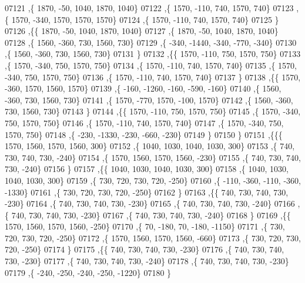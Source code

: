 \begin{DoxyCode}
07121     ,\{  1870,   -50,  1040,  1870,  1040\}
07122     ,\{  1570,  -110,   740,  1570,   740\}
07123     ,\{  1570,  -340,  1570,  1570,  1570\}
07124     ,\{  1570,  -110,   740,  1570,   740\}
07125     \}
07126    ,\{\{  1870,   -50,  1040,  1870,  1040\}
07127     ,\{  1870,   -50,  1040,  1870,  1040\}
07128     ,\{  1560,  -360,   730,  1560,   730\}
07129     ,\{  -340, -1440,  -340,  -770,  -340\}
07130     ,\{  1560,  -360,   730,  1560,   730\}
07131     \}
07132    ,\{\{  1570,  -110,   750,  1570,   750\}
07133     ,\{  1570,  -340,   750,  1570,   750\}
07134     ,\{  1570,  -110,   740,  1570,   740\}
07135     ,\{  1570,  -340,   750,  1570,   750\}
07136     ,\{  1570,  -110,   740,  1570,   740\}
07137     \}
07138    ,\{\{  1570,  -360,  1570,  1560,  1570\}
07139     ,\{  -160, -1260,  -160,  -590,  -160\}
07140     ,\{  1560,  -360,   730,  1560,   730\}
07141     ,\{  1570,  -770,  1570,  -100,  1570\}
07142     ,\{  1560,  -360,   730,  1560,   730\}
07143     \}
07144    ,\{\{  1570,  -110,   750,  1570,   750\}
07145     ,\{  1570,  -340,   750,  1570,   750\}
07146     ,\{  1570,  -110,   740,  1570,   740\}
07147     ,\{  1570,  -340,   750,  1570,   750\}
07148     ,\{  -230, -1330,  -230,  -660,  -230\}
07149     \}
07150    \}
07151   ,\{\{\{  1570,  1560,  1570,  1560,   300\}
07152     ,\{  1040,  1030,  1040,  1030,   300\}
07153     ,\{   740,   730,   740,   730,  -240\}
07154     ,\{  1570,  1560,  1570,  1560,  -230\}
07155     ,\{   740,   730,   740,   730,  -240\}
07156     \}
07157    ,\{\{  1040,  1030,  1040,  1030,   300\}
07158     ,\{  1040,  1030,  1040,  1030,   300\}
07159     ,\{   730,   720,   730,   720,  -250\}
07160     ,\{  -110,  -360,  -110,  -360, -1330\}
07161     ,\{   730,   720,   730,   720,  -250\}
07162     \}
07163    ,\{\{   740,   730,   740,   730,  -230\}
07164     ,\{   740,   730,   740,   730,  -230\}
07165     ,\{   740,   730,   740,   730,  -240\}
07166     ,\{   740,   730,   740,   730,  -230\}
07167     ,\{   740,   730,   740,   730,  -240\}
07168     \}
07169    ,\{\{  1570,  1560,  1570,  1560,  -250\}
07170     ,\{    70,  -180,    70,  -180, -1150\}
07171     ,\{   730,   720,   730,   720,  -250\}
07172     ,\{  1570,  1560,  1570,  1560,  -660\}
07173     ,\{   730,   720,   730,   720,  -250\}
07174     \}
07175    ,\{\{   740,   730,   740,   730,  -230\}
07176     ,\{   740,   730,   740,   730,  -230\}
07177     ,\{   740,   730,   740,   730,  -240\}
07178     ,\{   740,   730,   740,   730,  -230\}
07179     ,\{  -240,  -250,  -240,  -250, -1220\}
07180     \}

\end{DoxyCode}
